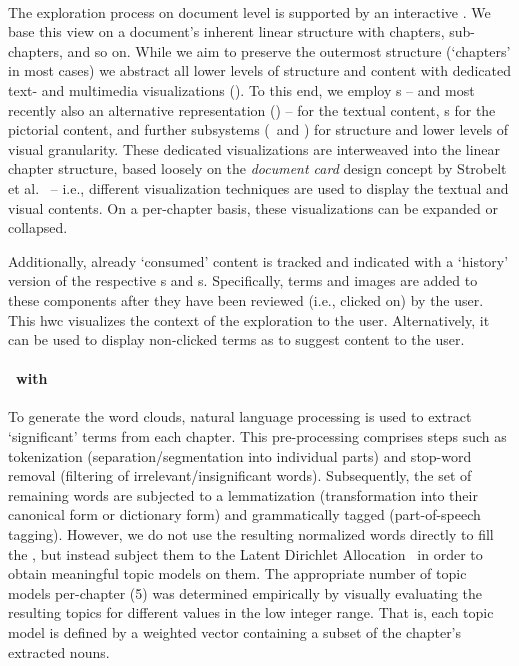 \paragraph*{\TableOfContents}
The exploration process on document level is supported by an interactive \toc.
%
We base this view on a document's inherent linear structure with chapters, sub-chapters, and so on. 
%
While we aim to preserve the outermost structure (`chapters' in most cases) we abstract all lower levels of structure and content with dedicated text- and multimedia visualizations (). 
%
To this end, we employ \wc s -- and most recently also an alternative representation () -- for the textual content, \is s for the pictorial content, and further subsystems (\tib\ and \snps) for structure and lower levels of visual granularity.
%
These dedicated visualizations are interweaved into the linear chapter structure, based loosely on the \emph{document card} design concept by Strobelt et al.~\cite{5290723} -- i.e., different visualization techniques are used to display the textual and visual contents.
%
On a per-chapter basis, these visualizations can be expanded or collapsed. 

Additionally, already `consumed' content is tracked and indicated with a `history' version of the respective \wc s and \is s. 
%
Specifically, terms and images are added to these components after they have been reviewed (i.e., clicked on) by the user. 
%
This \acrfull{hwc} visualizes the context of the exploration to the user. 
%
Alternatively, it can   be used to display non-clicked terms as to suggest content to the user.



\paragraph*{\WordCloud\ with \Topicbar}
To generate the word clouds, natural language processing is used to extract `significant' terms from each chapter. 
%
This pre-processing comprises steps such as tokenization (separation/segmentation into individual parts) and stop-word removal (filtering of irrelevant/insignificant words).
%
Subsequently, the set of remaining words are subjected to a lemmatization (transformation into their canonical form or dictionary form) and grammatically tagged (part-of-speech tagging). 
%
However, we do not use the resulting normalized words directly to fill the \wc, but instead subject them to the Latent Dirichlet Allocation~\cite{blei2003latent} in order to obtain meaningful topic models on them. 
%
The appropriate number of topic models per-chapter (5) was determined empirically by visually evaluating the resulting topics for different values in the low integer range.
%
That is, each topic model is defined by a weighted vector containing a subset of the chapter's extracted nouns. 

